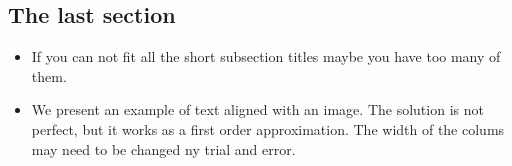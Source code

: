 \documentclass[a4,compress]{beamer}
\theoremstyle{plain}
\theoremstyle{definition}
\begin{document}

\subsection[Last section]{The last section}

\begin{frame}
  \begin{itemize}
    \item If you can not fit all the short subsection titles maybe you have too many of them.
    \item We present an example of text aligned with an image. The solution is not perfect, but
	it works as a first order approximation. The width of the colums may need to be changed ny trial and error.
    \begin{columns}[T, onlytextwidth]
      \begin{column}{0.07\textwidth}


\end{column}
\end{columns}
\end{itemize}
\end{frame}
\end{document}
